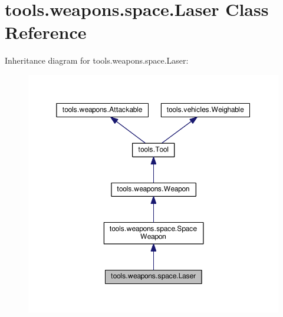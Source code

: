 \hypertarget{classtools_1_1weapons_1_1space_1_1_laser}{}\section{tools.\+weapons.\+space.\+Laser Class Reference}
\label{classtools_1_1weapons_1_1space_1_1_laser}


Inheritance diagram for tools.\+weapons.\+space.\+Laser\+:
\nopagebreak
\begin{figure}[H]
\begin{center}
\leavevmode
\includegraphics[width=350pt]{classtools_1_1weapons_1_1space_1_1_laser__inherit__graph}
\end{center}
\end{figure}


